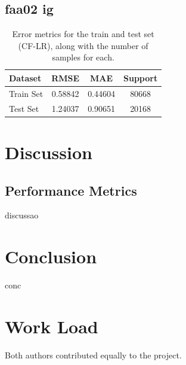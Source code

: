 \documentclass[conference]{IEEEtran}
\begin{document}
\subsection{faa02 ig}



\begin{table}[H]
\centering
\caption{Error metrics for the train and test set (CF-LR), along with the number of samples for each.}
\label{tab:model01_results}
\begin{tabular}{lccc}
\toprule
\textbf{Dataset} & \textbf{RMSE} & \textbf{MAE} & \textbf{Support} \\
\midrule
Train Set & 0.58842 & 0.44604 & 80668 \\
Test Set & 1.24037 & 0.90651 & 20168 \\
\bottomrule
\end{tabular}
\end{table}

\section{Discussion} 

\subsection{Performance Metrics}

discussao


\section{Conclusion}

conc


\section*{Work Load}

Both authors contributed equally to the project.



\end{document}
